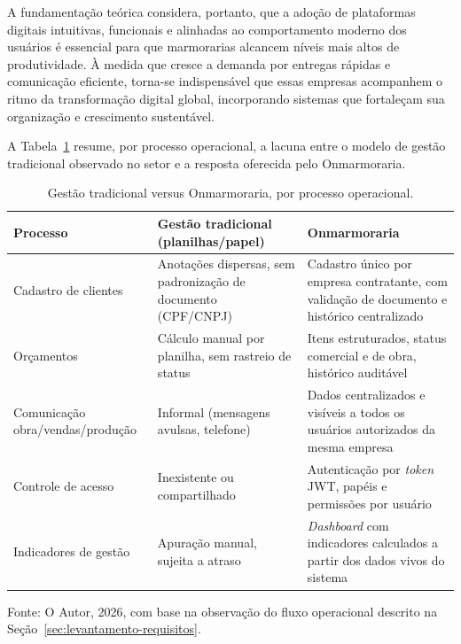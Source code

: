 A fundamentação teórica considera, portanto, que a adoção de plataformas digitais intuitivas, funcionais e alinhadas ao comportamento moderno dos usuários é essencial para que marmorarias alcancem níveis mais altos de produtividade. À medida que cresce a demanda por entregas rápidas e comunicação eficiente, torna-se indispensável que essas empresas acompanhem o ritmo da transformação digital global, incorporando sistemas que fortaleçam sua organização e crescimento sustentável.

A Tabela~\ref{tab:gestao-tradicional-vs-onmarmoraria} resume, por processo operacional, a lacuna entre o modelo de gestão tradicional observado no setor e a resposta oferecida pelo Onmarmoraria.

\begin{table}[H]
  \centering
  \caption{Gestão tradicional versus Onmarmoraria, por processo operacional.}
  \label{tab:gestao-tradicional-vs-onmarmoraria}
  \begin{tabular}{p{3.2cm}p{5.4cm}p{5.4cm}}
    \hline
    \textbf{Processo} & \textbf{Gestão tradicional (planilhas/papel)} & \textbf{Onmarmoraria} \\
    \hline
    Cadastro de clientes & Anotações dispersas, sem padronização de documento (CPF/CNPJ) & Cadastro único por empresa contratante, com validação de documento e histórico centralizado \\
    Orçamentos & Cálculo manual por planilha, sem rastreio de status & Itens estruturados, status comercial e de obra, histórico auditável \\
    Comunicação obra/vendas/produção & Informal (mensagens avulsas, telefone) & Dados centralizados e visíveis a todos os usuários autorizados da mesma empresa \\
    Controle de acesso & Inexistente ou compartilhado & Autenticação por \textit{token} JWT, papéis e permissões por usuário \\
    Indicadores de gestão & Apuração manual, sujeita a atraso & \textit{Dashboard} com indicadores calculados a partir dos dados vivos do sistema \\
    \hline
  \end{tabular}
  \begin{minipage}{0.95\textwidth}
    \vspace{0.3em}
    {\small Fonte: O Autor, 2026, com base na observação do fluxo operacional descrito na Seção~\ref{sec:levantamento-requisitos}.}
  \end{minipage}
\end{table}


